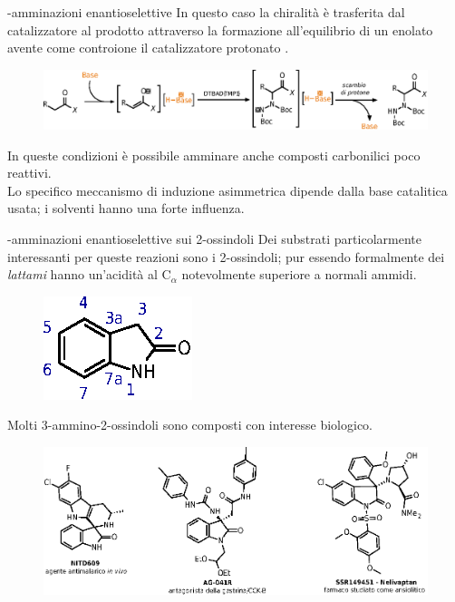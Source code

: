 \documentclass[10pt]{beamer}
\begin{document}
\begin{frame}[fragile]{{\textalpha}-amminazioni enantioselettive}
In questo caso la chiralità è trasferita dal catalizzatore al prodotto attraverso la \alert{formazione all'equilibrio di un enolato} avente come controione il catalizzatore protonato .
\begin{figure}[H] 
	\centering
	\includegraphics[scale=0.7]{P_basecat_amination.eps}
\end{figure}  
In queste condizioni è possibile amminare anche \alert{composti carbonilici poco reattivi}.\\
Lo specifico meccanismo di induzione asimmetrica dipende dalla base catalitica usata; i solventi hanno una forte influenza.

\end{frame}

\begin{frame}[fragile]{{\textalpha}-amminazioni enantioselettive sui 2-ossindoli}
Dei substrati particolarmente interessanti per queste reazioni sono i 2-ossindoli; pur essendo formalmente dei \textit{lattami} hanno un'\alert{acidità al C$_{\alpha}$ notevolmente superiore a normali ammidi}.\\
\begin{figure}[H] 
	\centering
	\includegraphics[scale=0.7]{P_oxindolering.eps}
\end{figure} 
Molti 3-ammino-2-ossindoli sono composti con \alert{interesse biologico}.
\begin{figure}[H] 
	\centering
	\includegraphics[scale=0.7]{P_oxindoledrugs.eps}
\end{figure} 
\end{frame}
\end{document}
